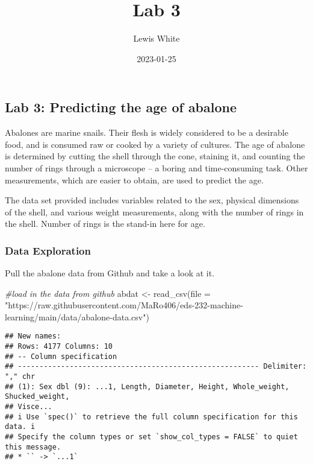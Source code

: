 \documentclass[
]{article}
\title{Lab 3}
\author{Lewis White}
\date{2023-01-25}
\newenvironment{Shaded}{\begin{snugshade}}{\end{snugshade}}
\newcommand{\AttributeTok}[1]{\textcolor[rgb]{0.77,0.63,0.00}{#1}}
\newcommand{\CommentTok}[1]{\textcolor[rgb]{0.56,0.35,0.01}{\textit{#1}}}
\newcommand{\FunctionTok}[1]{\textcolor[rgb]{0.00,0.00,0.00}{#1}}
\newcommand{\NormalTok}[1]{#1}
\newcommand{\OtherTok}[1]{\textcolor[rgb]{0.56,0.35,0.01}{#1}}
\newcommand{\StringTok}[1]{\textcolor[rgb]{0.31,0.60,0.02}{#1}}
\begin{document}
\maketitle

\hypertarget{lab-3-predicting-the-age-of-abalone}{%
\subsection{Lab 3: Predicting the age of
abalone}\label{lab-3-predicting-the-age-of-abalone}}

Abalones are marine snails. Their flesh is widely considered to be a
desirable food, and is consumed raw or cooked by a variety of cultures.
The age of abalone is determined by cutting the shell through the cone,
staining it, and counting the number of rings through a microscope -- a
boring and time-consuming task. Other measurements, which are easier to
obtain, are used to predict the age.

The data set provided includes variables related to the sex, physical
dimensions of the shell, and various weight measurements, along with the
number of rings in the shell. Number of rings is the stand-in here for
age.

\hypertarget{data-exploration}{%
\subsubsection{Data Exploration}\label{data-exploration}}

Pull the abalone data from Github and take a look at it.

\begin{Shaded}
\begin{Highlighting}[]
\CommentTok{\#load in the data from github}
\NormalTok{abdat }\OtherTok{\textless{}{-}} \FunctionTok{read\_csv}\NormalTok{(}\AttributeTok{file =} \StringTok{"https://raw.githubusercontent.com/MaRo406/eds{-}232{-}machine{-}learning/main/data/abalone{-}data.csv"}\NormalTok{)}
\end{Highlighting}
\end{Shaded}

\begin{verbatim}
## New names:
## Rows: 4177 Columns: 10
## -- Column specification
## -------------------------------------------------------- Delimiter: "," chr
## (1): Sex dbl (9): ...1, Length, Diameter, Height, Whole_weight, Shucked_weight,
## Visce...
## i Use `spec()` to retrieve the full column specification for this data. i
## Specify the column types or set `show_col_types = FALSE` to quiet this message.
## * `` -> `...1`
\end{verbatim}
\end{document}
